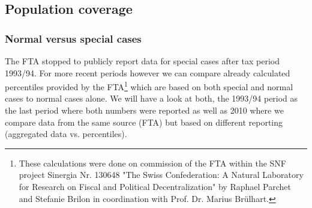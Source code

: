 \documentclass[twoside]{article}\usepackage[]{graphicx}\usepackage[]{color}
\begin{document}
\begin{multicols}{2}



\subsection{Population coverage}

\subsubsection{Normal versus special cases}

The FTA stopped to publicly report data for special cases after tax period 1993/94. 
For more recent periods however we can compare already calculated percentiles provided by the FTA\footnote{These calculations were done on commission of the FTA within the SNF project Sinergia Nr. 130648 "The Swiss Confederation: A Natural Laboratory for Research on Fiscal and Political Decentralization" by Raphael Parchet and Stefanie Brilon in coordination with Prof. Dr. Marius Brülhart.} which are based on both special and normal cases to normal cases alone.
We will have a look at both, the 1993/94 period as the last period where both 
numbers were reported as well as 2010 where we compare data from the same source (FTA)
but based on different reporting (aggregated data vs. percentiles).




\end{multicols}
\end{document}
